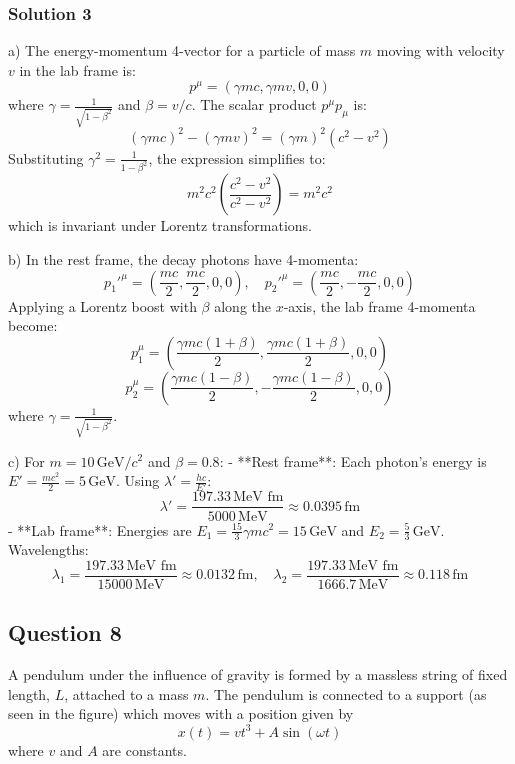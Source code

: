 \documentclass{article}
\begin{document}
\subsubsection{Solution 3}
a) The energy-momentum 4-vector for a particle of mass \( m \) moving with velocity \( v \) in the lab frame is:
\[
p^\mu = \left( \gamma m c, \gamma m v, 0, 0 \right)
\]
where \( \gamma = \frac{1}{\sqrt{1 - \beta^2}} \) and \( \beta = v/c \). The scalar product \( p^\mu p_\mu \) is:
\[
\left( \gamma m c \right)^2 - \left( \gamma m v \right)^2 = (\gamma m)^2 \left( c^2 - v^2 \right)
\]
Substituting \( \gamma^2 = \frac{1}{1 - \beta^2} \), the expression simplifies to:
\[
m^2 c^2 \left( \frac{c^2 - v^2}{c^2 - v^2} \right) = m^2 c^2
\]
which is invariant under Lorentz transformations.

b) In the rest frame, the decay photons have 4-momenta:
\[
p_1'^\mu = \left( \frac{m c}{2}, \frac{m c}{2}, 0, 0 \right), \quad p_2'^\mu = \left( \frac{m c}{2}, -\frac{m c}{2}, 0, 0 \right)
\]
Applying a Lorentz boost with \( \beta \) along the \( x \)-axis, the lab frame 4-momenta become:
\[
p_1^\mu = \left( \frac{\gamma m c (1 + \beta)}{2}, \frac{\gamma m c (1 + \beta)}{2}, 0, 0 \right)
\]
\[
p_2^\mu = \left( \frac{\gamma m c (1 - \beta)}{2}, -\frac{\gamma m c (1 - \beta)}{2}, 0, 0 \right)
\]
where \( \gamma = \frac{1}{\sqrt{1 - \beta^2}} \).

c) For \( m = 10 \, \text{GeV}/c^2 \) and \( \beta = 0.8 \):
- **Rest frame**: Each photon's energy is \( E' = \frac{m c^2}{2} = 5 \, \text{GeV} \). Using \( \lambda' = \frac{h c}{E'} \):
\[
\lambda' = \frac{197.33 \, \text{MeV fm}}{5000 \, \text{MeV}} \approx 0.0395 \, \text{fm}
\]
- **Lab frame**: Energies are \( E_1 = \frac{15}{3} \gamma m c^2 = 15 \, \text{GeV} \) and \( E_2 = \frac{5}{3} \, \text{GeV} \). Wavelengths:
\[
\lambda_1 = \frac{197.33 \, \text{MeV fm}}{15000 \, \text{MeV}} \approx 0.0132 \, \text{fm}, \quad \lambda_2 = \frac{197.33 \, \text{MeV fm}}{1666.7 \, \text{MeV}} \approx 0.118 \, \text{fm}
\]


\subsection{Question 8}

A pendulum under the influence of gravity is formed by a massless string of fixed length, $L$, attached to a mass $m$. The pendulum is connected to a support (as seen in the figure) which moves with a position given by
\[
x(t) = vt^3 + A\sin(\omega t)
\]
where $v$ and $A$ are constants. \\
\end{document}

